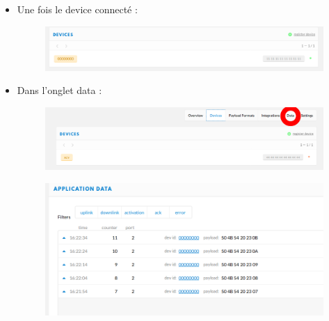 \documentclass{article}
\begin{document}
    \begin{itemize}
    \item Une fois le device connecté :

  \begin{figure}[H]
\begin{center}
\advance\leftskip-3cm
\advance\rightskip-3cm
\includegraphics[keepaspectratio=true,scale=0.4]{device_connected.png}
\label{visina8}
\end{center}\end{figure}
  
  
  \item Dans l'onglet data :
  
  \begin{figure}[H]
\begin{center}
\advance\leftskip-3cm
\advance\rightskip-3cm
\includegraphics[keepaspectratio=true,scale=0.4]{data_tab.png}
\label{visina8}
\end{center}\end{figure}
  
  
  
  \begin{figure}[H]
\begin{center}
\advance\leftskip-3cm
\advance\rightskip-3cm
\includegraphics[keepaspectratio=true,scale=0.4]{payload.png}
\label{visina8}
\end{center}\end{figure}
  
  
\end{itemize}
\end{document}
